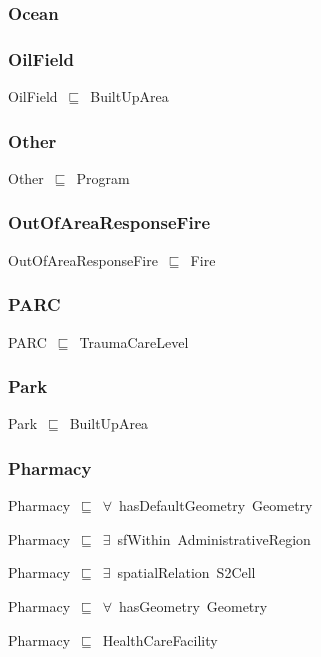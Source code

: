\documentclass{article}
\begin{document}
\subsubsection*{Ocean}

\subsubsection*{OilField}

OilField~\ensuremath{\sqsubseteq}~BuiltUpArea~

\subsubsection*{Other}

Other~\ensuremath{\sqsubseteq}~Program~

\subsubsection*{OutOfAreaResponseFire}

OutOfAreaResponseFire~\ensuremath{\sqsubseteq}~Fire~

\subsubsection*{PARC}

PARC~\ensuremath{\sqsubseteq}~TraumaCareLevel~

\subsubsection*{Park}

Park~\ensuremath{\sqsubseteq}~BuiltUpArea~

\subsubsection*{Pharmacy}

Pharmacy~\ensuremath{\sqsubseteq}~\ensuremath{\forall}~hasDefaultGeometry~Geometry~

Pharmacy~\ensuremath{\sqsubseteq}~\ensuremath{\exists}~sfWithin~AdministrativeRegion~

Pharmacy~\ensuremath{\sqsubseteq}~\ensuremath{\exists}~spatialRelation~S2Cell~

Pharmacy~\ensuremath{\sqsubseteq}~\ensuremath{\forall}~hasGeometry~Geometry~

Pharmacy~\ensuremath{\sqsubseteq}~HealthCareFacility~
\end{document}
